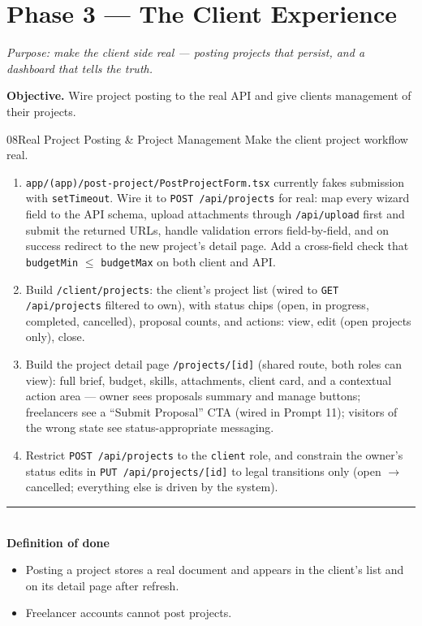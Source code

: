 \documentclass[11pt,a4paper]{article}
\newcommand{\dod}{\medskip\noindent\textcolor{donegreen}{\rule{\linewidth}{0.5pt}}\\[1mm]\textbf{\textcolor{donegreen}{Definition of done}}\\[-2mm]}
\newcommand{\objective}[1]{\noindent\textbf{Objective.} #1\medskip}
\newcommand{\filepath}[1]{\texttt{#1}}
\begin{document}
\section{Phase 3 --- The Client Experience}

\textit{Purpose: make the client side real --- posting projects that persist,
and a dashboard that tells the truth.}

\objective{Wire project posting to the real API and give clients management of
their projects.}

\begin{promptbox}{08}{Real Project Posting \& Project Management}
Make the client project workflow real.

\begin{enumerate}[leftmargin=1.6em]
  \item \filepath{app/(app)/post-project/PostProjectForm.tsx} currently fakes
        submission with \texttt{setTimeout}. Wire it to
        \texttt{POST /api/projects} for real: map every wizard field to the API
        schema, upload attachments through \texttt{/api/upload} first and submit the
        returned URLs, handle validation errors field-by-field, and on success
        redirect to the new project's detail page. Add a cross-field check that
        \texttt{budgetMin} $\le$ \texttt{budgetMax} on both client and API.
  \item Build \texttt{/client/projects}: the client's project list (wired to
        \texttt{GET /api/projects} filtered to own), with status chips (open,
        in progress, completed, cancelled), proposal counts, and actions: view, edit
        (open projects only), close.
  \item Build the project detail page \texttt{/projects/[id]} (shared route, both
        roles can view): full brief, budget, skills, attachments, client card, and a
        contextual action area --- owner sees proposals summary and manage buttons;
        freelancers see a ``Submit Proposal'' CTA (wired in Prompt 11); visitors of
        the wrong state see status-appropriate messaging.
  \item Restrict \texttt{POST /api/projects} to the \texttt{client} role, and
        constrain the owner's status edits in \texttt{PUT /api/projects/[id]} to
        legal transitions only (open $\rightarrow$ cancelled; everything else is
        driven by the system).
\end{enumerate}

\dod
\begin{itemize}[leftmargin=1.6em]
  \item Posting a project stores a real document and appears in the client's list and
        on its detail page after refresh.
  \item Freelancer accounts cannot post projects.
\end{itemize}
\end{promptbox}
\end{document}
